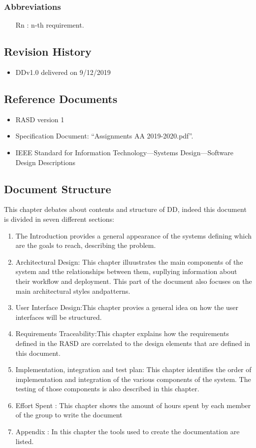 	\subsubsection {Abbreviations}
\begin{itemize}
\item	[Rn]: n-th requirement.
\end{itemize}
\subsection {Revision History}
\begin{itemize}
\item	DDv1.0 delivered on 9/12/2019
\end{itemize}
\subsection {Reference Documents}
\begin{itemize}
\item 	RASD version 1
\item	Specification Document: “Assignments AA 2019-2020.pdf”.
\item	IEEE Standard for Information Technology—Systems Design—Software Design Descriptions
\end{itemize}
\subsection{Document Structure}
This chapter debates about contents and structure of DD, indeed this document is divided in seven different sections:
\begin{enumerate}
\item	The Introduction provides a general appearance of the systems defining which are the goals to reach, describing the problem.
\item Architectural Design: This chapter illuustrates the main components of the system and tthe relationships between them, supllying information about their workflow and deployment. This part of the document also focuses on the main architectural styles andpatterns.
\item User Interface Design:This chapter provies a general idea on how the user interfaces will be structured.
\item  Requirements Traceability:This chapter explains how the requirements defined in the RASD are correlated to the design elements that are defined in this document.
\item  Implementation, integration and test plan: This chapter identifies the order of implementation and integration of the various components of the system. The testing of those components is also described in this chapter.
\item  Effort Spent : This chapter shows the amount of hours spent by each member of the group to write the document
\item  Appendix : In this chapter the tools used to create the documentation are listed.
\end{enumerate}
